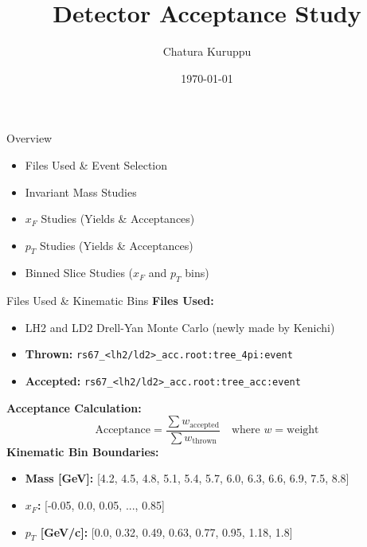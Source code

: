\documentclass[aspectratio=169]{beamer}
\title{Detector Acceptance Study}
\author{Chatura Kuruppu}
\date{\today}
\begin{document}
\begin{frame}
    \titlepage
\end{frame}

\begin{frame}{Overview}
    \begin{itemize}
        \item Files Used \& Event Selection
        \item Invariant Mass Studies
        \item $x_F$ Studies (Yields \& Acceptances)
        \item $p_T$ Studies (Yields \& Acceptances)
        \item Binned Slice Studies ($x_F$ and $p_T$ bins)
    \end{itemize}
\end{frame}

\begin{frame}{Files Used \& Kinematic Bins}
    \textbf{Files Used:}
    \begin{itemize}
        \item LH2 and LD2 Drell-Yan Monte Carlo (newly made by Kenichi)
        \item \textbf{Thrown:} \texttt{rs67\_<lh2/ld2>\_acc.root:tree\_4pi:event}
        \item \textbf{Accepted:} \texttt{rs67\_<lh2/ld2>\_acc.root:tree\_acc:event}
    \end{itemize}
    \vspace{0.2cm}
    \textbf{Acceptance Calculation:}
    \begin{equation*}
        \text{Acceptance} = \frac{\sum w_{\text{accepted}}}{\sum w_{\text{thrown}}} \quad \text{where } w = \text{weight}
    \end{equation*}
    \vspace{0.1cm}
    \textbf{Kinematic Bin Boundaries:}
    \begin{itemize}
        \item \textbf{Mass [GeV]:} [4.2, 4.5, 4.8, 5.1, 5.4, 5.7, 6.0, 6.3, 6.6, 6.9, 7.5, 8.8]
        \item \textbf{$x_F$:} [-0.05, 0.0, 0.05, ..., 0.85]
        \item \textbf{$p_T$ [GeV/c]:} [0.0, 0.32, 0.49, 0.63, 0.77, 0.95, 1.18, 1.8]
    \end{itemize}
\end{frame}
\end{document}
